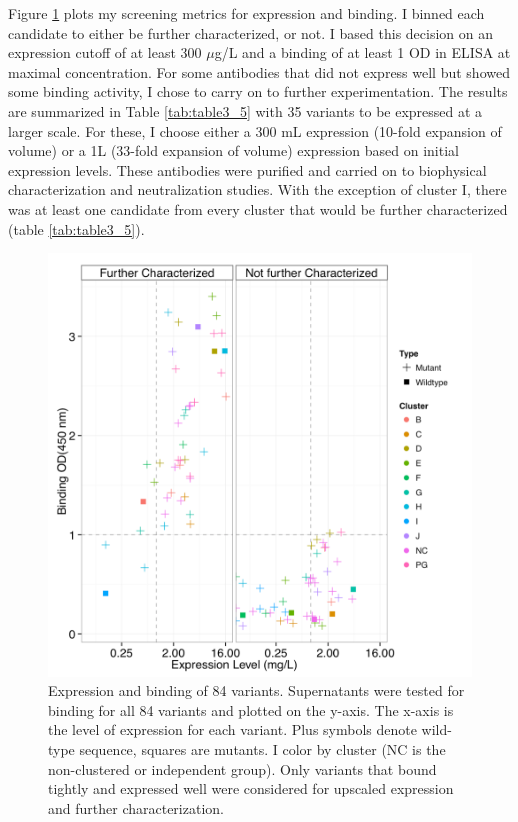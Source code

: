 Figure \ref{fig:figure3_15} plots my screening metrics for expression and binding. I binned each candidate to either be further characterized, or not. I based this decision on an expression cutoff of at least 300 $\mu$g/L and a binding of at least 1 OD in ELISA at maximal concentration.  For some antibodies that did not express well but showed some binding activity, I chose to carry on to further experimentation. The results are summarized in Table \ref{tab:table3_5} with 35 variants to be expressed at a larger scale. For these, I choose either a 300 mL expression (10-fold expansion of volume) or a 1L (33-fold expansion of volume) expression based on initial expression levels. These antibodies were purified and carried on to biophysical characterization and neutralization studies. With the exception of cluster I, there was at least one candidate from every cluster that would be further characterized (table \ref{tab:table3_5}).


\begin{figure}[H]
   \centering
   \includegraphics[width=\linewidth]{images/chapter3/figure3_15.pdf} %
   \caption[Expression and Binding of 84 Variants]{Expression and binding of 84 variants. Supernatants were tested for binding for all 84 variants and plotted on the y-axis. The x-axis is the level of expression for each variant. Plus symbols denote wild-type sequence, squares are mutants. I color by cluster (NC is the non-clustered or independent group). Only variants that bound tightly and expressed well were considered for upscaled expression and further characterization.}
   \label{fig:figure3_15}
\end{figure}

